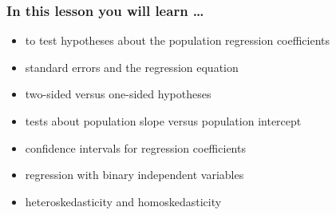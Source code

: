 

\begin{frame}
  \frametitle{In this lesson you will learn \dots}
  \begin{itemize}
  \item to test hypotheses about the population regression coefficients
  \item standard errors and the regression equation
  \item two-sided versus one-sided hypotheses
  \item tests about population slope versus population intercept
  \item confidence intervals for regression coefficients
  \item regression with binary independent variables
  \item heteroskedasticity and homoskedasticity
  \end{itemize}
\end{frame}

